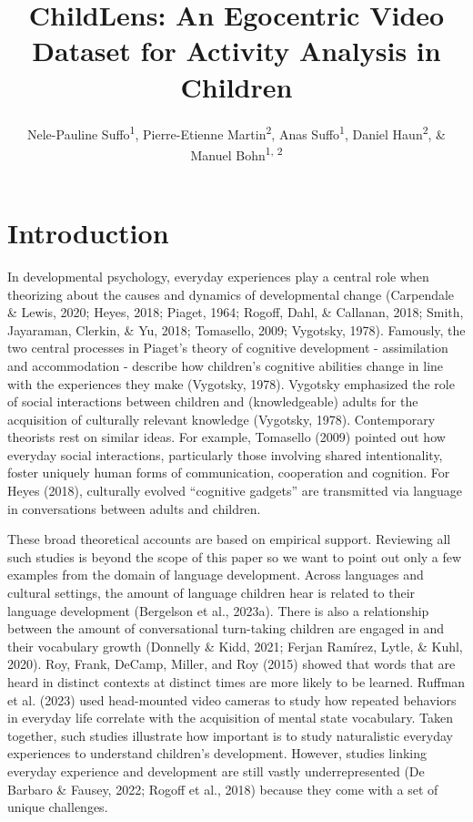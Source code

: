 \documentclass[
  man,floatsintext]{apa6}
\title{ChildLens: An Egocentric Video Dataset for Activity Analysis in Children}
\author{Nele-Pauline Suffo\textsuperscript{1}, Pierre-Etienne Martin\textsuperscript{2}, Anas Suffo\textsuperscript{1}, Daniel Haun\textsuperscript{2}, \& Manuel Bohn\textsuperscript{1, 2}}
\date{}
\affiliation{\vspace{0.5cm}\textsuperscript{1} Institute of Psychology in Education, Leuphana University Lüneburg, Universitätsallee 1, 21335 Lüneburg, Germany\\\textsuperscript{2} Comparative Cultural Psychology, Max Planck Institute for Evolutionary Anthropology, Deutscher Platz 6, Leipzig, 04103, Germany}
\begin{document}
\maketitle

\section{Introduction}\label{introduction}

In developmental psychology, everyday experiences play a central role when theorizing about the causes and dynamics of developmental change (Carpendale \& Lewis, 2020; Heyes, 2018; Piaget, 1964; Rogoff, Dahl, \& Callanan, 2018; Smith, Jayaraman, Clerkin, \& Yu, 2018; Tomasello, 2009; Vygotsky, 1978). Famously, the two central processes in Piaget's theory of cognitive development - assimilation and accommodation - describe how children's cognitive abilities change in line with the experiences they make (Vygotsky, 1978). Vygotsky emphasized the role of social interactions between children and (knowledgeable) adults for the acquisition of culturally relevant knowledge (Vygotsky, 1978). Contemporary theorists rest on similar ideas. For example, Tomasello (2009) pointed out how everyday social interactions, particularly those involving shared intentionality, foster uniquely human forms of communication, cooperation and cognition. For Heyes (2018), culturally evolved ``cognitive gadgets'' are transmitted via language in conversations between adults and children.

These broad theoretical accounts are based on empirical support. Reviewing all such studies is beyond the scope of this paper so we want to point out only a few examples from the domain of language development. Across languages and cultural settings, the amount of language children hear is related to their language development (Bergelson et al., 2023a). There is also a relationship between the amount of conversational turn-taking children are engaged in and their vocabulary growth (Donnelly \& Kidd, 2021; Ferjan Ramírez, Lytle, \& Kuhl, 2020). Roy, Frank, DeCamp, Miller, and Roy (2015) showed that words that are heard in distinct contexts at distinct times are more likely to be learned. Ruffman et al. (2023) used head-mounted video cameras to study how repeated behaviors in everyday life correlate with the acquisition of mental state vocabulary. Taken together, such studies illustrate how important is to study naturalistic everyday experiences to understand children's development. However, studies linking everyday experience and development are still vastly underrepresented (De Barbaro \& Fausey, 2022; Rogoff et al., 2018) because they come with a set of unique challenges.
\end{document}

